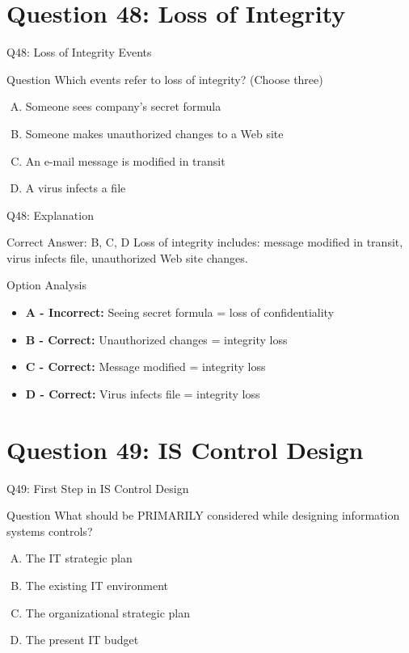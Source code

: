 \documentclass{beamer}
\begin{document}
	\section{Question 48: Loss of Integrity}
	
	\begin{frame}{Q48: Loss of Integrity Events}
		\begin{block}{Question}
			Which events refer to loss of integrity? (Choose three)
		\end{block}
		\begin{enumerate}[(A)]
			\item Someone sees company's secret formula
			\item Someone makes unauthorized changes to a Web site
			\item An e-mail message is modified in transit
			\item A virus infects a file
		\end{enumerate}
	\end{frame}
	
	\begin{frame}{Q48: Explanation}
		\begin{block}{Correct Answer: B, C, D}
			Loss of integrity includes: message modified in transit, virus infects file, unauthorized Web site changes.
		\end{block}
		\begin{block}{Option Analysis}
			\begin{itemize}
				\item \textbf{A - Incorrect:} Seeing secret formula = loss of confidentiality
				\item \textbf{B - Correct:} Unauthorized changes = integrity loss
				\item \textbf{C - Correct:} Message modified = integrity loss
				\item \textbf{D - Correct:} Virus infects file = integrity loss
			\end{itemize}
		\end{block}
	\end{frame}
	
	\section{Question 49: IS Control Design}
	
	\begin{frame}{Q49: First Step in IS Control Design}
		\begin{block}{Question}
			What should be PRIMARILY considered while designing information systems controls?
		\end{block}
		\begin{enumerate}[(A)]
			\item The IT strategic plan
			\item The existing IT environment
			\item The organizational strategic plan
			\item The present IT budget
		\end{enumerate}
	\end{frame}
	
\end{document}
